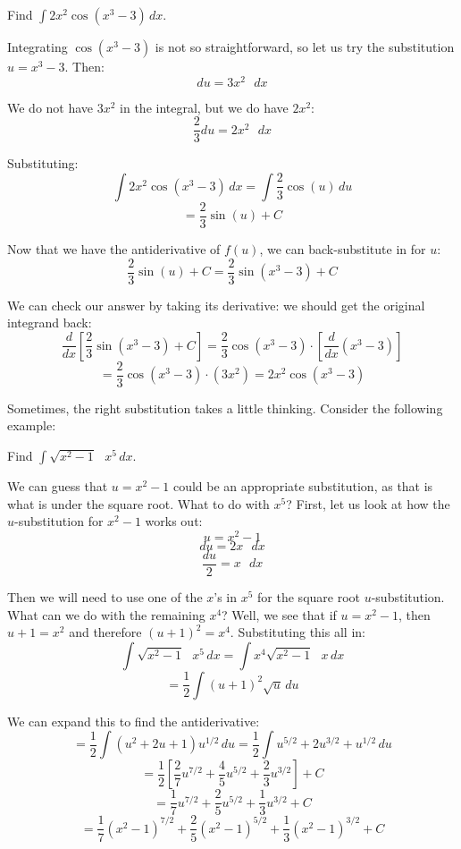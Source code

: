 \begin{Worked}
\begin{Problem}
Find $\int 2 x^2 \cos{ \left( x^3 - 3 \right)}\,dx$.
\end{Problem}
\begin{Solution}
Integrating $\cos{ \left( x^3 - 3 \right)}$ is not so 
straightforward, so let us try the substitution $u = x^3 - 3$. Then:
$$du = 3 x^2 \text{ }dx$$

We do not have $3 x^2$ in the integral, but we do have $2 x^2$:
$$\frac{2}{3} du = 2 x^2 \text{ } dx$$

Substituting:
$$\int 2 x^2 \cos{ \left( x^3 - 3 \right)} \,dx = \int \frac{2}{3} \cos{ \left( 
u \right)}\,du$$
$$= \frac{2}{3} \sin{ \left( u \right)} + C$$

Now that we have the antiderivative of $f(u)$, we can back-substitute in for 
$u$:
$$ \frac{2}{3} \sin{ \left( u \right)} + C = \frac{2}{3} \sin{ \left( x^3 - 3 
\right)} + C$$

We can check our answer by taking its derivative: we should get the original 
integrand back:
$$\frac{d}{dx} \left[ \frac{2}{3} \sin{ \left( x^3 - 3 \right)} + C \right] = 
\frac{2}{3} \cos{ \left( x^3 - 3 \right)}  \cdot \left[ \frac{d}{dx} \left( x^3 
- 3 \right) \right]$$
$$= \frac{2}{3} \cos{ \left( x^3 - 3 \right)} \cdot \left( 3 x^2 \right) = 2 
x^2 \cos{ \left( x^3 - 3 \right)}$$
\end{Solution}
\end{Worked}

Sometimes, the right substitution takes a little thinking. Consider the 
following example:

\begin{Worked}
\begin{Problem}
Find $\int \sqrt{x^2 - 1} \text{ }x^5\,dx$.
\end{Problem}
\begin{Solution}
We can guess that $u = x^2 - 1$ could be an appropriate 
substitution, as that is what is under the square root. What to do with $x^5$? 
First, let us look at how the $u$-substitution for $x^2 - 1$ works out:
$$u = x^2 - 1$$
$$du = 2x\text{ }dx$$
$$\frac{du}{2} = x\text{ }dx$$

Then we will need to use one of the $x$'s in $x^5$ for the square root 
$u$-substitution. What can we do with the remaining $x^4$? Well, we see that 
if $u = x^2 - 1$, then $u + 1 = x^2$ and therefore $\left( u + 1 \right)^2 = 
x^4$. Substituting this all in:
$$\int \sqrt{x^2 - 1} \text{ }x^5\,dx = \int x^4 \sqrt{x^2 - 1}\text{ }x\,dx$$
$$= \frac{1}{2} \int \left( u + 1 \right)^2 \sqrt{u}\,du$$

We can expand this to find the antiderivative:
$$= \frac{1}{2} \int \left( u^2 + 2u + 1 \right) u^{1/2}\,du = \frac{1}{2} 
\int u^{5/2} + 2u^{3/2} + u^{1/2}\,du$$
$$= \frac{1}{2} \left[ \frac{2}{7}u^{7/2} + \frac{4}{5}u^{5/2} + \frac{2}{3}
u^{3/2} \right] + C$$
$$= \frac{1}{7}u^{7/2} + \frac{2}{5}u^{5/2} + \frac{1}{3}u^{3/2} + C$$
$$= \frac{1}{7} \left( x^2 - 1 \right)^{7/2} + \frac{2}{5} \left( x^2 - 1 
\right)^{5/2} + \frac{1}{3} \left( x^2 - 1 \right)^{3/2} + C$$
\end{Solution}
\end{Worked}

